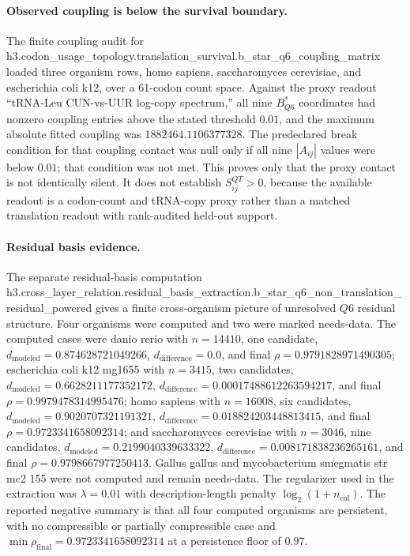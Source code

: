 \paragraph{Observed coupling is below the survival boundary.}
The finite coupling audit for h3.codon\_usage\_topology.translation\_survival.b\_star\_q6\_coupling\_matrix loaded three organism rows, homo sapiens, saccharomyces cerevisiae, and escherichia coli k12, over a 61-codon count space.  Against the proxy readout ``tRNA-Leu CUN-vs-UUR log-copy spectrum,'' all nine $B^*_{Q6}$ coordinates had nonzero coupling entries above the stated threshold $0.01$, and the maximum absolute fitted coupling was $1882464.1106377328$.  The predeclared break condition for that coupling contact was null only if all nine $|A_{ij}|$ values were below $0.01$; that condition was not met.  This proves only that the proxy contact is not identically silent.  It does not establish $S^{QT}_{ij}>0$, because the available readout is a codon-count and tRNA-copy proxy rather than a matched translation readout with rank-audited held-out support.

\paragraph{Residual basis evidence.}
The separate residual-basis computation h3.cross\_layer\_relation.residual\_basis\_extraction.b\_star\_q6\_non\_translation\_residual\_powered gives a finite cross-organism picture of unresolved $Q6$ residual structure.  Four organisms were computed and two were marked needs-data.  The computed cases were danio rerio with $n=14410$, one candidate, $d_{\mathrm{modeled}}=0.874628721049266$, $d_{\mathrm{difference}}=0.0$, and final $\rho=0.9791828971490305$; escherichia coli k12 mg1655 with $n=3415$, two candidates, $d_{\mathrm{modeled}}=0.6628211177352172$, $d_{\mathrm{difference}}=0.00017488612263594217$, and final $\rho=0.9979478314995476$; homo sapiens with $n=16008$, six candidates, $d_{\mathrm{modeled}}=0.9020707321191321$, $d_{\mathrm{difference}}=0.018824203448813415$, and final $\rho=0.9723341658092314$; and saccharomyces cerevisiae with $n=3046$, nine candidates, $d_{\mathrm{modeled}}=0.2199040339633322$, $d_{\mathrm{difference}}=0.008171838236265161$, and final $\rho=0.9798667977250413$.  Gallus gallus and mycobacterium smegmatis str mc2 155 were not computed and remain needs-data.  The regularizer used in the extraction was $\lambda=0.01$ with description-length penalty $\log_2(1+n_{\mathrm{col}})$.  The reported negative summary is that all four computed organisms are persistent, with no compressible or partially compressible case and $\min \rho_{\mathrm{final}}=0.9723341658092314$ at a persistence floor of $0.97$.

